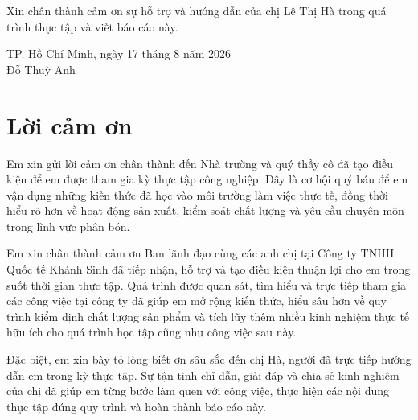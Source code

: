 Xin chân thành cảm ơn sự hỗ trợ và hướng dẫn của chị Lê Thị Hà trong quá trình thực tập và viết báo cáo này.

\vspace{1cm}
\begin{flushright}
TP. Hồ Chí Minh, ngày 17 tháng 8 năm 2026\\[1.5cm]
Đỗ Thuỳ Anh
\end{flushright}

\chapter*{Lời cảm ơn}
Em xin gửi lời cảm ơn chân thành đến Nhà trường và quý thầy cô đã tạo điều kiện để em được tham gia kỳ thực tập công nghiệp. Đây là cơ hội quý báu để em vận dụng những kiến thức đã học vào môi trường làm việc thực tế, đồng thời hiểu rõ hơn về hoạt động sản xuất, kiểm soát chất lượng và yêu cầu chuyên môn trong lĩnh vực phân bón.

Em xin chân thành cảm ơn Ban lãnh đạo cùng các anh chị tại Công ty TNHH Quốc tế Khánh Sinh đã tiếp nhận, hỗ trợ và tạo điều kiện thuận lợi cho em trong suốt thời gian thực tập. Quá trình được quan sát, tìm hiểu và trực tiếp tham gia các công việc tại công ty đã giúp em mở rộng kiến thức, hiểu sâu hơn về quy trình kiểm định chất lượng sản phẩm và tích lũy thêm nhiều kinh nghiệm thực tế hữu ích cho quá trình học tập cũng như công việc sau này.

Đặc biệt, em xin bày tỏ lòng biết ơn sâu sắc đến chị Hà, người đã trực tiếp hướng dẫn em trong kỳ thực tập. Sự tận tình chỉ dẫn, giải đáp và chia sẻ kinh nghiệm của chị đã giúp em từng bước làm quen với công việc, thực hiện các nội dung thực tập đúng quy trình và hoàn thành báo cáo này.

\tableofcontents
\listoffigures
\listoftables

\clearpage
{}

